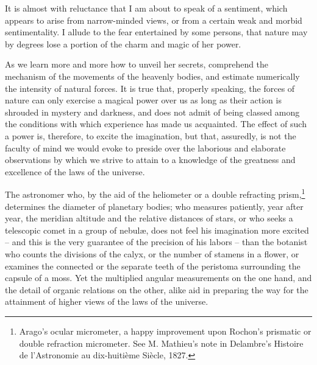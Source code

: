 It is almost with reluctance that I am about to speak of a sentiment, which appears to arise from narrow-minded views, or from a certain weak and morbid sentimentality. I allude to the fear entertained by some persons, that nature may by degrees lose a portion of the charm and magic of her power.

As we learn more and more how to unveil her secrets, comprehend the mechanism of the movements of the heavenly bodies, and estimate numerically the intensity of natural forces. It is true that, properly speaking, the forces of nature can only exercise a magical power over us as long as their action is shrouded in mystery and darkness, and does not admit of being classed among the conditions with which experience has made us acquainted. The effect of such a power is, therefore, to excite the imagination, but that, assuredly, is not the faculty of mind we would evoke to preside over the laborious and elaborate observations by which we strive to attain to a knowledge of the greatness and excellence of the laws of the universe.

The astronomer who, by the aid of the heliometer or a double refracting prism,\footnote{Arago's ocular micrometer, a happy improvement upon Rochon's prismatic or double refraction micrometer. See M. Mathieu's note in Delambre's Histoire de l'Astronomie au dix-huiti\`eme Si\`ecle, 1827.} determines the diameter of planetary bodies; who measures patiently, year after year, the meridian altitude and the relative distances of stars, or who seeks a telescopic comet in a group of nebul\ae, does not feel his imagination more excited -- and this is the very guarantee of the precision of his labors -- than the botanist who counts the divisions of the calyx, or the number of stamens in a flower, or examines the connected or the separate teeth of the peristoma surrounding the capsule of a moss. Yet the multiplied angular measurements on the one hand, and the detail of organic relations on the other, alike aid in preparing the way for the attainment of higher views of the laws of the universe.

